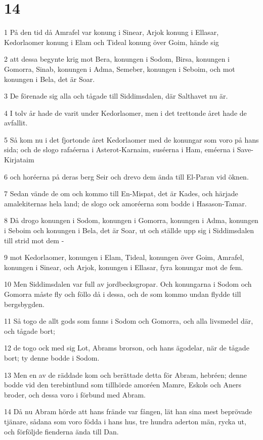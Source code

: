 \chapter{14}

\par 1 På den tid då Amrafel var konung i Sinear, Arjok konung i Ellasar, Kedorlaomer konung i Elam och Tideal konung över Goim, hände sig
\par 2 att dessa begynte krig mot Bera, konungen i Sodom, Birsa, konungen i Gomorra, Sinab, konungen i Adma, Semeber, konungen i Seboim, och mot konungen i Bela, det är Soar.
\par 3 De förenade sig alla och tågade till Siddimsdalen, där Salthavet nu är.
\par 4 I tolv år hade de varit under Kedorlaomer, men i det trettonde året hade de avfallit.
\par 5 Så kom nu i det fjortonde året Kedorlaomer med de konungar som voro på hans sida; och de slogo rafaéerna i Asterot-Karnaim, suséerna i Ham, eméerna i Save-Kirjataim
\par 6 och horéerna på deras berg Seir och drevo dem ända till El-Paran vid öknen.
\par 7 Sedan vände de om och kommo till En-Mispat, det är Kades, och härjade amalekiternas hela land; de slogo ock amoréerna som bodde i Hasason-Tamar.
\par 8 Då drogo konungen i Sodom, konungen i Gomorra, konungen i Adma, konungen i Seboim och konungen i Bela, det är Soar, ut och ställde upp sig i Siddimsdalen till strid mot dem -
\par 9 mot Kedorlaomer, konungen i Elam, Tideal, konungen över Goim, Amrafel, konungen i Sinear, och Arjok, konungen i Ellasar, fyra konungar mot de fem.
\par 10 Men Siddimsdalen var full av jordbecksgropar. Och konungarna i Sodom och Gomorra måste fly och föllo då i dessa, och de som kommo undan flydde till bergsbygden.
\par 11 Så togo de allt gods som fanns i Sodom och Gomorra, och alla livsmedel där, och tågade bort;
\par 12 de togo ock med sig Lot, Abrams brorson, och hans ägodelar, när de tågade bort; ty denne bodde i Sodom.
\par 13 Men en av de räddade kom och berättade detta för Abram, hebréen; denne bodde vid den terebintlund som tillhörde amoréen Mamre, Eskols och Aners broder, och dessa voro i förbund med Abram.
\par 14 Då nu Abram hörde att hans frände var fången, lät han sina mest beprövade tjänare, sådana som voro födda i hans hus, tre hundra aderton män, rycka ut, och förföljde fienderna ända till Dan.
